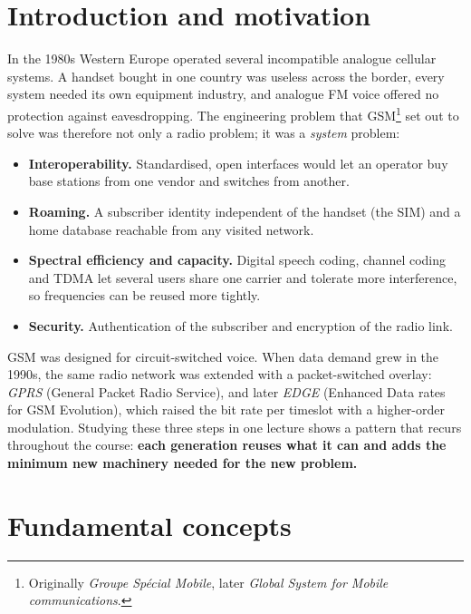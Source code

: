 \documentclass[11pt,a4paper]{article}
\begin{document}
\section{Introduction and motivation}\label{sec:intro}
In the 1980s Western Europe operated several incompatible analogue cellular systems.
A handset bought in one country was useless across the border, every system needed
its own equipment industry, and analogue FM voice offered no protection against
eavesdropping. The engineering problem that GSM\footnote{Originally \emph{Groupe
Spécial Mobile}, later \emph{Global System for Mobile communications}.} set out to
solve was therefore not only a radio problem; it was a \emph{system} problem:
\begin{itemize}
  \item \textbf{Interoperability.} Standardised, open interfaces would let an operator
        buy base stations from one vendor and switches from another.
  \item \textbf{Roaming.} A subscriber identity independent of the handset (the SIM)
        and a home database reachable from any visited network.
  \item \textbf{Spectral efficiency and capacity.} Digital speech coding, channel
        coding and TDMA let several users share one carrier and tolerate more
        interference, so frequencies can be reused more tightly.
  \item \textbf{Security.} Authentication of the subscriber and encryption of the radio link.
\end{itemize}
GSM was designed for circuit-switched voice. When data demand grew in the 1990s,
the same radio network was extended with a packet-switched overlay: \emph{GPRS}
(General Packet Radio Service), and later \emph{EDGE} (Enhanced Data rates for GSM
Evolution), which raised the bit rate per timeslot with a higher-order modulation.
Studying these three steps in one lecture shows a pattern that recurs throughout the
course: \textbf{each generation reuses what it can and adds the minimum new
machinery needed for the new problem.}

\section{Fundamental concepts}\label{sec:fundamentals}
\end{document}
